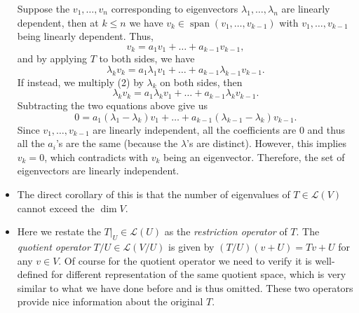 \documentclass[11pt]{article}
\newcommand{\df}[1]{\textit{\textsf{#1}}}
\newcommand{\s}{\operatorname{span}}
\renewcommand{\d}{\dim}
\newcommand{\LV}{\mathcal{L}(V)}
\newcommand{\bv}{v_1,\dots,v_n}
\begin{document}
\begin{itemize}
    Suppose the $\bv$ corresponding to eigenvectors $\lambda_1,\dots,\lambda_n$ are linearly dependent, then at $k \leq n$ we have $v_k \in \s(v_1,\dots,v_{k-1})$ with $v_1,\dots,v_{k-1}$ being linearly dependent. Thus, 
    \begin{equation}
        v_k = a_1 v_1 + \dots + a_{k-1}v_{k-1},
    \end{equation}
    and by applying $T$ to both sides, we have $$\lambda_k v_k = a_1 \lambda_1 v_1 + \dots + a_{k-1} \lambda_{k-1}v_{k-1}.$$ If instead, we multiply (2) by $\lambda_k$ on both sides, then $$\lambda_k v_k = a_1 \lambda_k v_1 + \dots + a_{k-1} \lambda_k v_{k-1}.$$ Subtracting the two equations above give us $$0 = a_1 (\lambda_1 - \lambda_k) v_1 + \dots + a_{k-1} (\lambda_{k-1}-\lambda_k) v_{k-1}.$$ Since $v_1, \dots, v_{k-1}$ are linearly independent, all the coefficients are 0 and thus all the $a_i$'s are the same (because the $\lambda$'s are distinct). However, this implies $v_k = 0$, which contradicts with $v_k$ being an eigenvector. Therefore, the set of eigenvectors are linearly independent.
    \item The direct corollary of this is that the number of eigenvalues of $T \in \LV$ cannot exceed the $\d V$.
    \item Here we restate the $T|_U \in \mathcal{L}(U)$ as the \df{restriction operator} of $T$. The \df{quotient operator} $T/U \in \mathcal{L}(V/U)$ is given by $(T/U)(v+U) = Tv+U$ for any $v \in V$. Of course for the quotient operator we need to verify it is well-defined for different representation of the same quotient space, which is very similar to what we have done before and is thus omitted. These two operators provide nice information about the original $T$.
\end{itemize}
\end{document}

